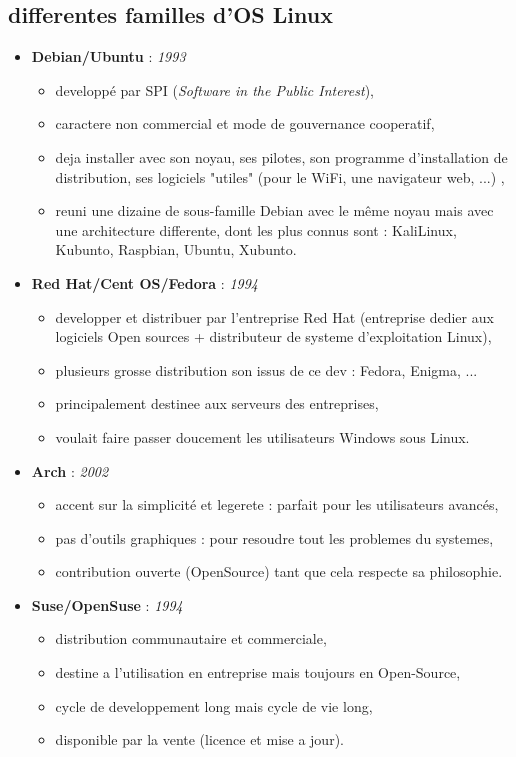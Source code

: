 \subsection{differentes familles d'OS Linux} 

\begin{itemize}
\item \textbf{Debian/Ubuntu} : \textit{1993}
    \begin{itemize}
    \item developpé par SPI (\textit{Software in the Public Interest}),
	\item caractere non commercial et mode de gouvernance cooperatif,
	\item deja installer avec son noyau, ses pilotes, son programme d'installation de distribution, ses logiciels "utiles" (pour le WiFi, une navigateur web, ...) ,
	\item reuni une dizaine de sous-famille Debian avec le même noyau mais avec une architecture differente, dont les plus connus sont : KaliLinux, Kubunto, Raspbian, Ubuntu, Xubunto.\newline 
    \end{itemize}
   
\item \textbf{Red Hat/Cent OS/Fedora} : \textit{1994}
    \begin{itemize}
	\item developper et distribuer par l'entreprise Red Hat (entreprise dedier aux logiciels Open sources + distributeur de systeme d'exploitation Linux),
	\item plusieurs grosse distribution son issus de ce dev : Fedora, Enigma, ...
	\item principalement destinee aux serveurs des entreprises,
	\item voulait faire passer doucement les utilisateurs Windows sous Linux.\newline
	\end{itemize}

\item \textbf{Arch} : \textit{2002}
    \begin{itemize}
	\item accent sur la simplicité et legerete : parfait pour les utilisateurs avancés,
	\item pas d'outils graphiques : pour resoudre tout les problemes du systemes,
	\item contribution ouverte (OpenSource) tant que cela respecte sa philosophie.\newline
	\end{itemize}
	
\item \textbf{Suse/OpenSuse} : \textit{1994}
    \begin{itemize}
	\item distribution communautaire et commerciale,
	\item destine a l'utilisation en entreprise mais toujours en Open-Source,
	\item cycle de developpement long mais cycle de vie long,
	\item disponible par la vente (licence et mise a jour).
	\end{itemize}
\end{itemize}